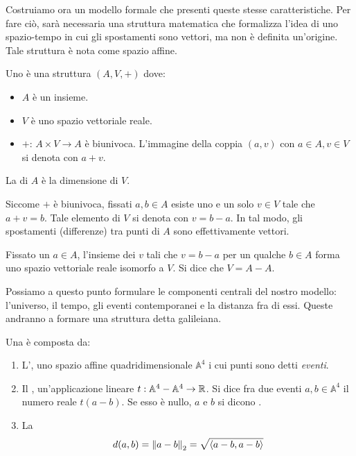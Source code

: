 Costruiamo ora un modello formale che presenti queste stesse caratteristiche. Per fare ciò, sarà necessaria una struttura matematica che formalizza l'idea di uno spazio-tempo in cui gli spostamenti sono vettori, ma non è definita un'origine. Tale struttura è nota come spazio affine.
\begin{definition}
  Uno  è una struttura $(A,V,+)$ dove:
  \begin{itemize}
    \item $A$ è un insieme.
    \item $V$ è uno spazio vettoriale reale.
    \item $+:\, A\times V \to A$ è biunivoca. L'immagine della coppia $(a,v)$ con $a \in  A, v \in V$ si denota con $a+v$.
  \end{itemize}
  La  di $A$ è la dimensione di $V$.
\end{definition}
\begin{remark}
  Siccome $+$ è biunivoca, fissati $a,b \in A$ esiste uno e un solo $v \in V$ tale che $a + v = b$. Tale elemento di $V$ si denota con $v = b - a$. In tal modo, gli spostamenti (differenze) tra punti di $A$ sono effettivamente vettori.
\end{remark}
\begin{remark}
Fissato un $a \in A$, l'insieme dei $v$ tali che $v = b - a$ per un qualche $b \in A$ forma uno spazio vettoriale reale isomorfo a $V$. Si dice che $V = A - A$.
\end{remark}

Possiamo a questo punto formulare le componenti centrali del nostro modello: l'universo, il tempo, gli eventi contemporanei e la distanza fra di essi. Queste andranno a formare una struttura detta galileiana.
\begin{definition}
  Una  è composta da:
  \begin{enumerate}
    \item L', uno spazio affine quadridimensionale $\mathbb{A}^4$ i cui punti sono detti \emph{eventi}.
    \item Il , un'applicazione lineare $t:\mathbb{A}^4 - \mathbb{A}^4 \to \mathbb{R}$. Si dice  fra due eventi $a,b \in \mathbb{A}^4$ il numero reale $t(a-b)$. Se esso è nullo, $a$ e $b$ si dicono .
    \item La  \begin{equation}
    d(a,b) = \norm{a-b}_2 = \sqrt{\ev{a-b,a-b}}  
    \end{equation} 
  \end{enumerate}
\end{definition}

